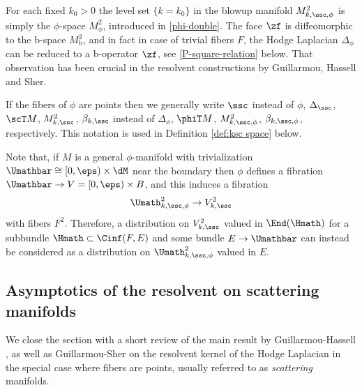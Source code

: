 \begin{Rem}
For each fixed $k_0> 0$ the level set $\{k=k_0\}$ in the blowup
manifold $M^{2}_{k, \ssc,\phi}$ is simply the $\phi$-space
$M_\phi^2$, introduced in \eqref{phi-double}. The face $\zf$ is diffeomorphic to
the b-space $M^{2}_\text{b}$, and in fact in case of trivial
fibers $F$, the Hodge Laplacian $\Delta_{\phi}$ can be reduced to a
b-operator $\zf$, see \eqref{P-square-relation} below. That observation has been crucial in
the resolvent constructions by Guillarmou, Hassell and Sher.
\end{Rem}

If the fibers of $\phi$ are points then we generally write $\ssc$ instead of $\phi$, \eg $\Delta_{\ssc}$, $\scT M$, $M^2_{k,\ssc}$,
$\beta_{k, \ssc}$ instead of $\Delta_\phi$, $\phiT M$, $M^2_{k,\ssc,\phi}$, $\beta_{k, \ssc,\phi}$, respectively. This
notation is used \eg in Definition \ref{def:ksc space} below.

Note that, if $M$ is a general $\phi$-manifold with trivialization $\Umathbar\cong[0,\eps)\times\dM$
near the boundary then $\phi$ defines a fibration $\Umathbar\to V=[0,\eps)\times B$, and this induces a fibration
\begin{equation}
\label{eqn:F2 fibration}
\Umath^2_{k,\ssc,\phi} \to V^2_{k,\ssc}
\end{equation}
with fibers $F^2$. Therefore, a distribution on $V^2_{k,\ssc}$ valued in $\End(\Hmath)$ for a
subbundle $\Hmath\subset \Cinf(F,E)$ and some bundle $E\to\Umathbar$ can instead be considered as a distribution on $\Umath^2_{k,\ssc,\phi}$ valued in $E$.

\subsection{Asymptotics of the resolvent on scattering manifolds} \label{section 4.4}
We close the section with a short review of the main
result by Guillarmou-Hassell \cite{guillarmou2008resolvent}, as well as
Guillarmou-Sher \cite{guillarmou2014low} on the resolvent
kernel of the Hodge Laplacian in the special case where fibers are points, usually referred to as
\emph{scattering} manifolds.

